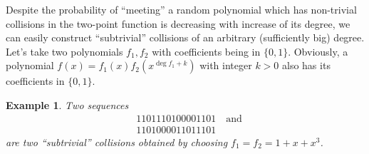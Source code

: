 \documentclass[12pt, a4paper]{article}
\newtheorem{example}{Example}
\begin{document}
Despite the probability of ``meeting'' a random polynomial which has non-trivial
collisions in the two-point function is decreasing with increase of its degree,
we can easily construct ``subtrivial'' collisions of an arbitrary (sufficiently
big) degree. Let's take two polynomials $f_1, f_2$ with coefficients being in
$\{0, 1\}$. Obviously, a polynomial $f(x) = f_1(x) f_2(x^{\deg f_1 + k})$ with
integer $k > 0$ also has its coefficients in $\{0, 1\}$.

\begin{example}
  Two sequences
  \begin{align*}
    & 1101110100001101 \quad \text{and} \\
    & 1101000011011101
  \end{align*}
  are two ``subtrivial'' collisions obtained by choosing $f_1 = f_2 = 1 + x + x^3$.
\end{example}
\end{document}
